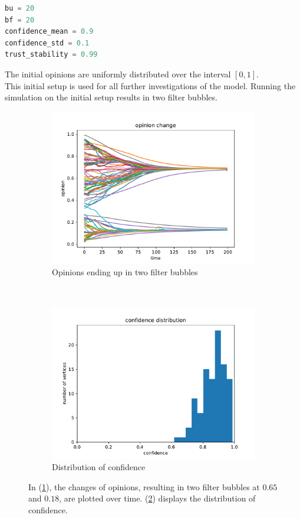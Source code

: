 \documentclass[11pt]{article}
\begin{document}
\begin{lstlisting}[language=Python]
bu = 20
bf = 20
confidence_mean = 0.9
confidence_std = 0.1
trust_stability = 0.99
\end{lstlisting}
The initial opinions are uniformly distributed over the interval $[0,1]$.\\
This initial setup is used for all further investigations of the model. Running the simulation on the initial setup results in two filter bubbles.

\begin{figure}[H]
    \begin{subfigure}[t]{0.5\textwidth}
    \includegraphics[width = \linewidth]{img/initial_setup_opinions.pdf}
    \caption{Opinions ending up in two filter bubbles}\label{sfig:opinit}
    \end{subfigure}
    ~
    \begin{subfigure}[t]{0.5\textwidth}
    \includegraphics[width = \linewidth]{img/initial_setup_confidence.pdf}
    \caption{Distribution of confidence}\label{sfig:confdist_init}
    \end{subfigure}
    \caption{In (\ref{sfig:opinit}), the changes of opinions, resulting in two filter bubbles at $0.65$ and $0.18$, are plotted over time. (\ref{sfig:confdist_init}) displays the distribution of confidence.}\label{sfig:init}
\end{figure}
\end{document}
